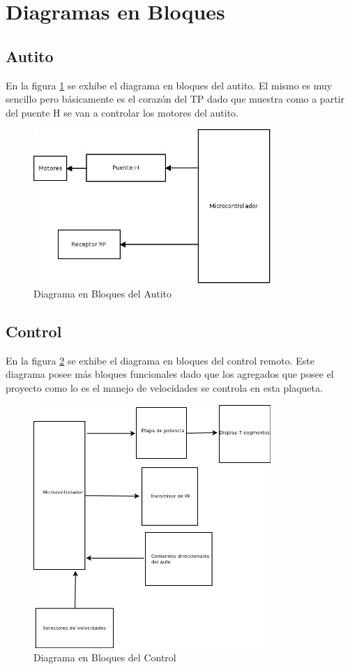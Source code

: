 \documentclass[a4paper,10pt]{article}
\begin{document}
		
	\section{Diagramas en Bloques}
		\subsection{Autito}
			En la figura \ref{timg004} se exhibe el diagrama en bloques del autito. El mismo es muy sencillo pero básicamente es el corazón del TP dado que 
			muestra como a partir del puente H se van a controlar los motores del autito. 
			\begin{figure}[!htb]
				\centering
				\includegraphics[width=9cm]{Imagenes/DiaBloqAutito.jpg}
				\caption{Diagrama en Bloques del Autito} \label{timg004}
			\end{figure}
		\subsection{Control}
			En la figura \ref{limg001} se exhibe el diagrama en bloques del control remoto. Este diagrama posee más bloques funcionales dado que los 
			agregados que posee el proyecto como lo es el manejo de velocidades se controla en esta plaqueta.  
			\begin{figure}[!htb]
				\centering
				\includegraphics[width=9cm]{Imagenes/Diagrama1.png}
				\caption{Diagrama en Bloques del Control} \label{limg001}
			\end{figure}
\end{document}
